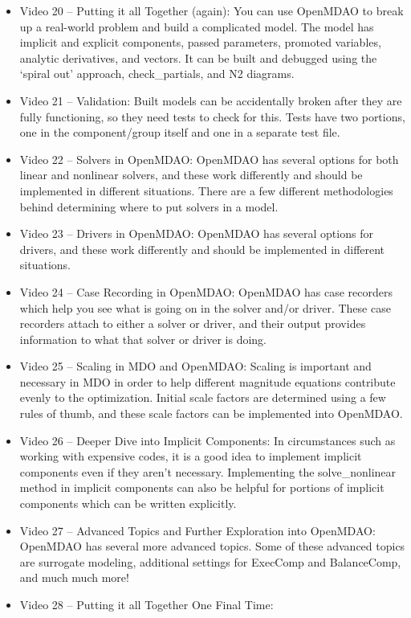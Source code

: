 \documentclass[12pt, letterpaper]{article}
\begin{document}
\begin{itemize}
	\item Video 20 – Putting it all Together (again): You can use OpenMDAO to break up a real-world problem and build a complicated model. The model has implicit and explicit components, passed parameters, promoted variables, analytic derivatives, and vectors. It can be built and debugged using the ‘spiral out’ approach, check\_partials, and N2 diagrams.
	\item Video 21 – Validation: Built models can be accidentally broken after they are fully functioning, so they need tests to check for this. Tests have two portions, one in the component/group itself and one in a separate test file.
	\item Video 22 – Solvers in OpenMDAO: OpenMDAO has several options for both linear and nonlinear solvers, and these work differently and should be implemented in different situations. There are a few different methodologies behind determining where to put solvers in a model. 
	\item Video 23 – Drivers in OpenMDAO: OpenMDAO has several options for drivers, and these work differently and should be implemented in different situations.
	\item Video 24 – Case Recording in OpenMDAO: OpenMDAO has case recorders which help you see what is going on in the solver and/or driver. These case recorders attach to either a solver or driver, and their output provides information to what that solver or driver is doing.
	\item Video 25 – Scaling in MDO and OpenMDAO: Scaling is important and necessary in MDO in order to help different magnitude equations contribute evenly to the optimization. Initial scale factors are determined using a few rules of thumb, and these scale factors can be implemented into OpenMDAO.
	\item Video 26 – Deeper Dive into Implicit Components: In circumstances such as working with expensive codes, it is a good idea to implement implicit components even if they aren’t necessary. Implementing the solve\_nonlinear method in implicit components can also be helpful for portions of implicit components which can be written explicitly.
	\item Video 27 – Advanced Topics and Further Exploration into OpenMDAO: OpenMDAO has several more advanced topics. Some of these advanced topics are surrogate modeling, additional settings for ExecComp and BalanceComp, and much much more!
	\item Video 28 – Putting it all Together One Final Time:
\end{itemize}
\end{document}
